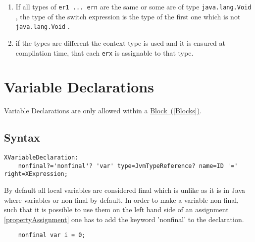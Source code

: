 \documentclass[a4paper,10pt]{scrreprt}
\newlength{\itemindentlen}
\begin{document}
\setlength{\itemindentlen}{\textwidth}
\begin{enumerate}
\addtolength{\itemindentlen}{-2em}

\item \begin{minipage}[t]{\itemindentlen}
If all types of \lstinline{er1 ... ern}
 are the same or some are of type \lstinline{java.lang.Void}
, the type of the switch expression is the type of the first one which is not \lstinline{java.lang.Void}
.
\end{minipage}

\item \begin{minipage}[t]{\itemindentlen}
if the types are different the context type is used and it is ensured at compilation time, that each \lstinline{erx}
 is assignable to that type.
\end{minipage}

\end{enumerate}
\addtolength{\itemindentlen}{2em}







\section{Variable Declarations\label{VariableDeclaration}}
Variable Declarations are only allowed within a 
\hyperref[Blocks]{Block~(\ref*{Blocks})}. 

\subsection{Syntax}
\begin{lstlisting}
XVariableDeclaration:
	nonfinal?='nonfinal'? 'var' type=JvmTypeReference? name=ID '=' right=XExpression;

\end{lstlisting}


By default all local variables are considered final which is unlike as it is in Java where variables or non-final by default.
In order to make a variable non-final, such that it is possible to use them on the left hand side of an assignment 
\autoref{propertyAssignment} one has to add the keyword 'nonfinal' to the declaration.

\begin{lstlisting}
	nonfinal var i = 0;

\end{lstlisting}
\end{document}
